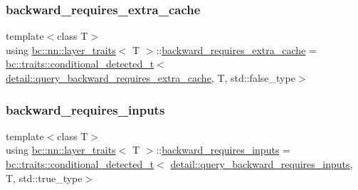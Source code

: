 \subsubsection{\texorpdfstring{backward\+\_\+requires\+\_\+extra\+\_\+cache}{backward\_requires\_extra\_cache}}
{\footnotesize\ttfamily template$<$class T$>$ \\
using \hyperlink{structbc_1_1nn_1_1layer__traits}{bc\+::nn\+::layer\+\_\+traits}$<$ T $>$\+::\hyperlink{structbc_1_1nn_1_1layer__traits_adb08bd29c79f30ddfbe4cc256ff5c822}{backward\+\_\+requires\+\_\+extra\+\_\+cache} =  \hyperlink{namespacebc_1_1traits_a1a6d378947ec32acd457890854bcd592}{bc\+::traits\+::conditional\+\_\+detected\+\_\+t}$<$ \hyperlink{namespacebc_1_1nn_1_1detail_a1599626f3fdc7ffbe459d9abf8325465}{detail\+::query\+\_\+backward\+\_\+requires\+\_\+extra\+\_\+cache}, T, std\+::false\+\_\+type$>$}

\mbox{\label{structbc_1_1nn_1_1layer__traits_af530493c93863e1f30a4f8c19fdcfceb}} 
\subsubsection{\texorpdfstring{backward\+\_\+requires\+\_\+inputs}{backward\_requires\_inputs}}
{\footnotesize\ttfamily template$<$class T$>$ \\
using \hyperlink{structbc_1_1nn_1_1layer__traits}{bc\+::nn\+::layer\+\_\+traits}$<$ T $>$\+::\hyperlink{structbc_1_1nn_1_1layer__traits_af530493c93863e1f30a4f8c19fdcfceb}{backward\+\_\+requires\+\_\+inputs} =  \hyperlink{namespacebc_1_1traits_a1a6d378947ec32acd457890854bcd592}{bc\+::traits\+::conditional\+\_\+detected\+\_\+t}$<$ \hyperlink{namespacebc_1_1nn_1_1detail_acb9ab0f627cee62dd68d673afc443608}{detail\+::query\+\_\+backward\+\_\+requires\+\_\+inputs}, T, std\+::true\+\_\+type$>$}

\mbox{\label{structbc_1_1nn_1_1layer__traits_adb5ce9f80eb56e874462cf49a02bf2d4}} 
